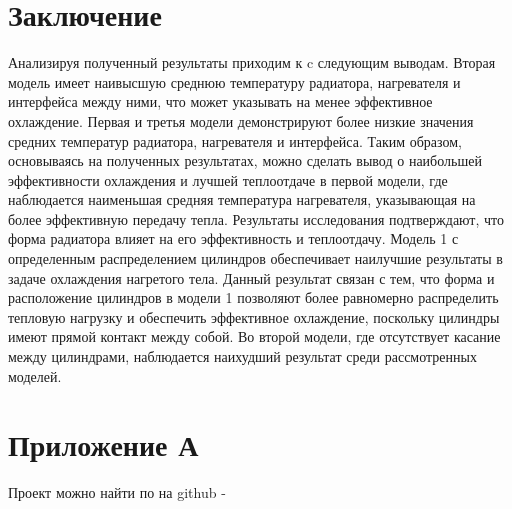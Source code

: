 \documentclass[a4paper,12pt]{article}
\theoremstyle{plain} %
\theoremstyle{definition} %
\theoremstyle{remark} %
\begin{document}
\section{Заключение}
Анализируя полученный результаты приходим к c следующим выводам.
Вторая модель имеет наивысшую среднюю температуру радиатора, нагревателя и интерфейса между ними, что может указывать на менее эффективное охлаждение.
Первая и третья модели демонстрируют более низкие значения средних температур радиатора, нагревателя и интерфейса.
Таким образом, основываясь на полученных результатах, можно сделать вывод о наибольшей эффективности охлаждения и лучшей теплоотдаче в первой модели, где наблюдается наименьшая средняя температура нагревателя, указывающая на более эффективную передачу тепла.
Результаты исследования подтверждают, что форма радиатора влияет на его эффективность и теплоотдачу. Модель 1 с определенным распределением цилиндров обеспечивает наилучшие результаты в задаче охлаждения нагретого тела.
Данный результат связан с тем, что форма и расположение цилиндров в модели 1 позволяют более равномерно распределить тепловую нагрузку и обеспечить эффективное охлаждение, поскольку цилиндры имеют прямой контакт между собой.
Во второй модели, где отсутствует касание между цилиндрами, наблюдается наихудший результат среди рассмотренных моделей.

\newpage

\newpage
\section{Приложение А}
\renewcommand{\thesection}{\Asbuk{section}}

Проект можно найти по на github - 
\end{document}
